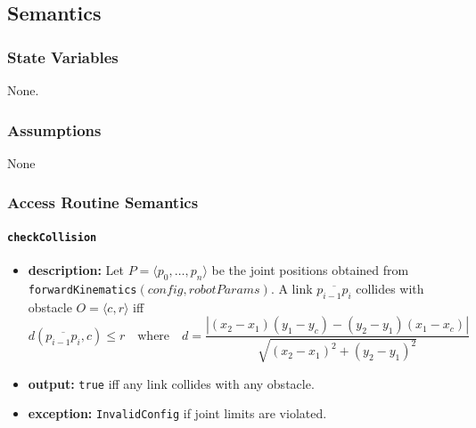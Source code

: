 \documentclass[12pt, titlepage]{article}
\begin{document}
\subsection{Semantics}
\subsubsection{State Variables}
None.

\subsubsection{Assumptions}
None

\subsubsection{Access Routine Semantics}

\paragraph{\texttt{checkCollision}}
\begin{itemize}
  \item \textbf{description:} Let $P=\langle p_0,\dots,p_n\rangle$ be the joint positions obtained from \texttt{forwardKinematics}$(config,robotParams)$.  
        A link $\overline{p_{i-1}p_i}$ collides with obstacle $O=\langle c,r\rangle$ iff
        \[
          d(\overline{p_{i-1}p_i},c) \le r
          \quad\text{where}\quad
          d = \frac{|(x_2-x_1)(y_1-y_c)-(y_2-y_1)(x_1-x_c)|}
                 {\sqrt{(x_2-x_1)^2+(y_2-y_1)^2}}
        \]
  \item \textbf{output:} \texttt{true} iff any link collides with any obstacle.
  \item \textbf{exception:} \texttt{InvalidConfig} if joint limits are violated.
\end{itemize}

\end{document}
